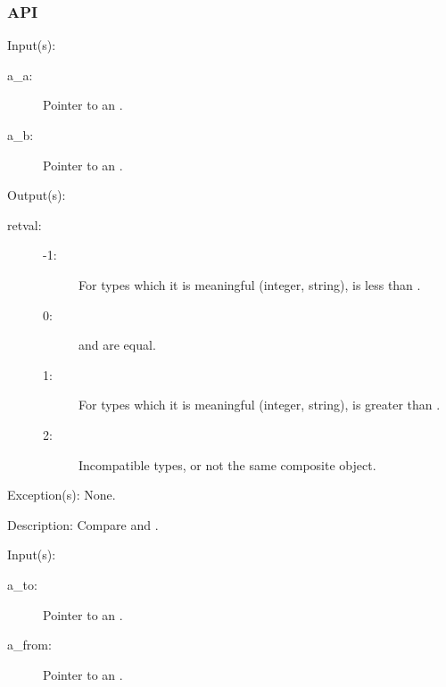 \subsubsection{API}
\begin{capi}
\label{nxo_compare}
	\begin{capilist}
	\item[Input(s): ]
		\begin{description}\item[]
		\item[a\_a: ]
			Pointer to an .
		\item[a\_b: ]
			Pointer to an .
		\end{description}
	\item[Output(s): ]
		\begin{description}\item[]
		\item[retval: ]
			\begin{description}\item[]
			\item[-1: ]
				For types which it is meaningful (integer,
				string),  is less than .
			\item[0: ]
				 and  are equal.
			\item[1: ]
				For types which it is meaningful (integer,
				string),  is greater than
				.
			\item[2: ]
				Incompatible types, or not the same composite
				object.
			\end{description}
		\end{description}
	\item[Exception(s): ] None.
	\item[Description: ]
		Compare  and .
	\end{capilist}
\label{nxo_dup}
	\begin{capilist}
	\item[Input(s): ]
		\begin{description}\item[]
		\item[a\_to: ]
			Pointer to an \classname{nxo}.
		\item[a\_from: ]
			Pointer to an \classname{nxo}.
		\end{description}

\end{capilist}
\end{capi}
